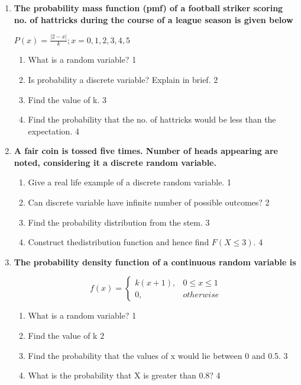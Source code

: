 \documentclass[a4paper,oneside, margin=1.4in]{book}
\begin{document}
\begin{enumerate}
     \item
	  \textbf{The probability mass function (pmf) of a football striker scoring no. of hattricks during the course of a league season is given below}
	  
	  \begin{center}
	  $\displaystyle P(x)  = \frac{|2-x|}{k}; x = 0, 1, 2, 3, 4, 5$
	  \end{center}
  
  \begin{enumerate}
    \item
    What is a random variable? \hfill 1
    \item
		Is probability a discrete variable? Explain in brief. \hfill 2
    \item  
	Find the value of k.  \hfill 3
    \item
	Find the probability that the no. of hattricks would be less than the expectation. \hfill 4
  \end{enumerate}
  
   \item
	  \textbf{A fair coin is tossed five times. Number of heads appearing are noted, considering it a discrete random variable.} 
  
  \begin{enumerate}
    \item
	Give a real life example of a discrete random variable. \hfill 1
    \item
	Can discrete variable have infinite number of possible outcomes? \hfill 2
    \item  
	Find the probability distribution from the stem. \hfill 3
    \item
	Construct thedistribution function and hence find $F(X \le 3)$. \hfill 4
  \end{enumerate}
  
  \item
  \textbf{The probability density function of a continuous random variable is}

$$
  f(x) =
\begin{cases}
k(x+1),  & 0 \le x \le 1 \\
0, & otherwise
\end{cases}
$$

  \begin{enumerate}
    \item
	What is a random variable? \hfill 1
    \item
    	Find the value of k \hfill 2
    \item
    	Find the probability that the values of x would lie between 0 and 0.5. \hfill 3
     \item
     	What is the probability that X is greater than 0.8?  \hfill 4
  \end{enumerate}
  

\end{enumerate}
\end{document}
